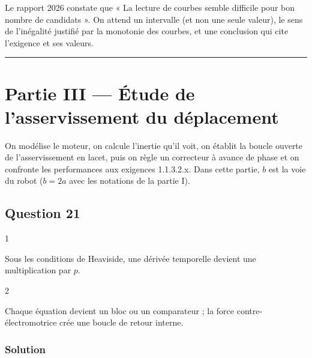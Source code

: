 \documentclass[11pt,a4paper]{article}
\begin{document}
\begin{jury}

Le rapport 2026 constate que « La lecture de courbes semble difficile pour bon nombre de candidats ». On attend un intervalle (et non une seule valeur), le sens de l'inégalité justifié par la monotonie des courbes, et une conclusion qui cite l'exigence et ses valeurs.

\end{jury}

\begin{center}\rule{0.5\linewidth}{0.5pt}\end{center}

\hypertarget{partie-iii-uxe9tude-de-lasservissement-du-duxe9placement}{%
\section{Partie III --- Étude de l'asservissement du déplacement}\label{partie-iii-uxe9tude-de-lasservissement-du-duxe9placement}}

On modélise le moteur, on calcule l'inertie qu'il voit, on établit la boucle ouverte de l'asservissement en lacet, puis on règle un correcteur à avance de phase et on confronte les performances aux exigences 1.1.3.2.x. Dans cette partie, \(b\) est la voie du robot (\(b = 2a\) avec les notations de la partie I).

\hypertarget{question-21}{%
\subsection{Question 21}\label{question-21}}

\begin{indication}{1}

Sous les conditions de Heaviside, une dérivée temporelle devient une multiplication par \(p\).

\end{indication}

\begin{indication}{2}

Chaque équation devient un bloc ou un comparateur ; la force contre-électromotrice crée une boucle de retour interne.

\end{indication}

\hypertarget{solution-20}{%
\subsubsection{Solution}\label{solution-20}}
\end{document}
